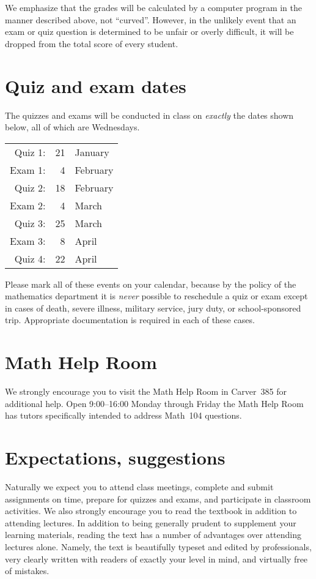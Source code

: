 \documentclass[11pt]{article}
\begin{document}
We emphasize that the grades will be calculated by a computer program
in the manner described
above, not ``curved''. However, in the unlikely event that an exam
or quiz question is determined
to be unfair or overly difficult, it will be dropped from the total score of
every student.

\section{Quiz and exam dates}
The quizzes and exams will be conducted in class
on {\em exactly} the dates shown below, all of which are Wednesdays.
\begin{center}\begin{tabular}{rrl}
Quiz 1:&21&January\\
Exam 1:&4&February\\
Quiz 2:&18&February\\
Exam 2:&4&March\\
Quiz 3:&25&March\\
Exam 3:&8&April\\
Quiz 4:&22&April
\end{tabular}\end{center}
Please mark all of these events on your calendar,
because by the policy of the mathematics department
it is {\em never} possible to reschedule a quiz or exam
except in cases of death, severe illness, military service,
jury duty, or school-sponsored trip.
Appropriate documentation is required in each of these cases.

\section{Math Help Room}\label{MathCenter}
We strongly encourage you to visit the Math Help Room
in Carver~385 for additional help.
Open 9:00--16:00 Monday through Friday the Math Help Room
has tutors specifically intended to address Math~104 questions.

\section{Expectations, suggestions} Naturally we expect you to attend 
class meetings, complete and submit assignments on 
time, prepare for quizzes and exams, and participate in classroom 
activities. We also strongly encourage you to read the textbook
in addition to attending lectures.
In addition to being generally prudent to 
supplement your learning materials, reading the text has a number of 
advantages over attending lectures alone. Namely, the text is beautifully 
typeset and edited by professionals, very clearly written with readers 
of exactly your level in mind, and virtually free of mistakes.
\end{document}
